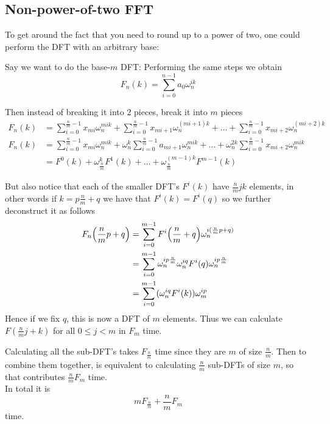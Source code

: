\subsection{Non-power-of-two FFT}

To get around the fact that you need to round up to a power of two, one could perform the DFT with an arbitrary base:

Say we want to do the base-$m$ DFT:
Performing the same steps we obtain
\[
    F_n(k) = \sum^{n-1}_{i=0} a_0\omega_n^{ik}
\]

Then instead of breaking it into $2$ pieces, break it into $m$ pieces
\begin{align*}
    F_n(k) &= \sum^{\frac{n}{m}-1}_{i=0} x_{mi}\omega_n^{mik} + \sum^{\frac{n}{m}-1}_{i=0} x_{mi+1}\omega_n^{(mi+1)k} + \ldots + \sum^{\frac{n}{m}-1}_{i=0} x_{mi+2}\omega_n^{(mi+2)k}\\
    F_n(k) &= \sum^{\frac{n}{m}-1}_{i=0} x_{mi}\omega_n^{mik} + \omega_n^k\sum^{\frac{n}{m}-1}_{i=0} a_{mi+1}\omega_n^{mik} + \ldots +  \omega_n^{2k}\sum^{\frac{n}{m}-1}_{i=0} x_{mi+2}\omega_n^{mik}\\
    &= F^0(k) + \omega_{\frac{n}{m}}^k F^1(k) + \ldots + \omega_{\frac{n}{m}}^{(m-1)k} F^{m-1}(k)
\end{align*}

But also notice that each of the smaller DFT's $F^i(k)$ have $\frac{n}{m}jk$ elements, in other words if $k = p\frac{n}{m} + q$ we have that $F^i(k) = F^i(q)$ so we further deconstruct it as follows
\begin{align*}
    F_n\bb{\frac{n}{m}p + q} &= \sum^{m-1}_{i=0} F^i\bb{\frac{n}{m} + q}\omega^{i(\frac{n}{m}p + q)}_n\\
    &= \sum^{m-1}_{i=0} \omega^{ip\frac{n}{m}}_n \omega_n^{iq} F^i(q)\omega^{ip\frac{n}{m}}_n\\
    &= \sum^{m-1}_{i=0} (\omega^{iq}_n F^i(k))\omega^{ip}_m\\
\end{align*}
Hence if we fix $q$, this is now a DFT of $m$ elements. Thus we can calculate $F(\frac{n}{m}j + k)$ for all $0 \leq j < m$ in $F_m$ time.

Calculating all the sub-DFT's takes $F_{\frac{n}{m}}$ time since they are $m$ of size $\frac{n}{m}$. Then to combine them together, is equivalent to calculating $\frac{n}{m}$ sub-DFTs of size $m$, so that contributes $\frac{n}{m}F_{m}$ time.\\
In total it is
\[
    mF_{\frac{n}{m}} + \frac{n}{m}F_m
\]
time.

